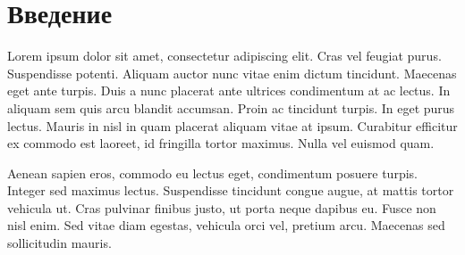 \section{Введение}
Lorem ipsum dolor sit amet, consectetur adipiscing elit. Cras vel feugiat purus. Suspendisse potenti. Aliquam auctor nunc vitae enim dictum tincidunt. Maecenas eget ante turpis. Duis a nunc placerat ante ultrices condimentum at ac lectus. In aliquam sem quis arcu blandit accumsan. Proin ac tincidunt turpis. In eget purus lectus. Mauris in nisl in quam placerat aliquam vitae at ipsum. Curabitur efficitur ex commodo est laoreet, id fringilla tortor maximus. Nulla vel euismod quam.
\par
Aenean sapien eros, commodo eu lectus eget, condimentum posuere turpis. Integer sed maximus lectus. Suspendisse tincidunt congue augue, at mattis tortor vehicula ut. Cras pulvinar finibus justo, ut porta neque dapibus eu. Fusce non nisl enim. Sed vitae diam egestas, vehicula orci vel, pretium arcu. Maecenas sed sollicitudin mauris.
